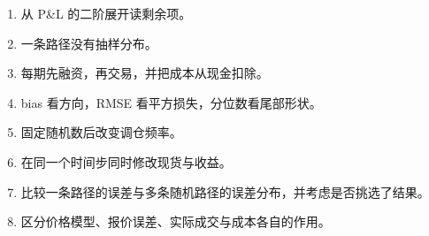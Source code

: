 \begin{enumerate}
  \item 从 P\&L 的二阶展开读剩余项。
  \item 一条路径没有抽样分布。
  \item 每期先融资，再交易，并把成本从现金扣除。
  \item bias 看方向，RMSE 看平方损失，分位数看尾部形状。
  \item 固定随机数后改变调仓频率。
  \item 在同一个时间步同时修改现货与收益。
  \item 比较一条路径的误差与多条随机路径的误差分布，并考虑是否挑选了结果。
  \item 区分价格模型、报价误差、实际成交与成本各自的作用。
\end{enumerate}
